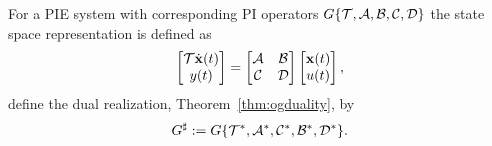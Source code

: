 \begin{definition}\label{def:dualrealization}
    For a PIE system with corresponding PI operators $G\{\mathcal{T}, \mathcal{A}, \mathcal{B}, \mathcal{C}, \mathcal{D}\}$ the state space representation is defined as
    \begin{equation}
        \begin{bmatrix}\mathcal{T}\dot{\mathbf{x}}(t)\\ y(t)\end{bmatrix}
        =
        \begin{bmatrix}\mathcal{A} & \mathcal{B}\\
              \mathcal{C} & \mathcal{D}\end{bmatrix}
        \begin{bmatrix}\mathbf{x}(t)\\ u(t)\end{bmatrix},
    \end{equation}
    define the dual realization, Theorem~\ref{thm:ogduality}, by
    \begin{equation}\label{eqn:dualrealization}
        G^\sharp
        :=
        G\{\mathcal{T}^*, \mathcal{A}^*, \mathcal{C}^*, \mathcal{B}^*, \mathcal{D}^*\}.
    \end{equation}
\end{definition}

